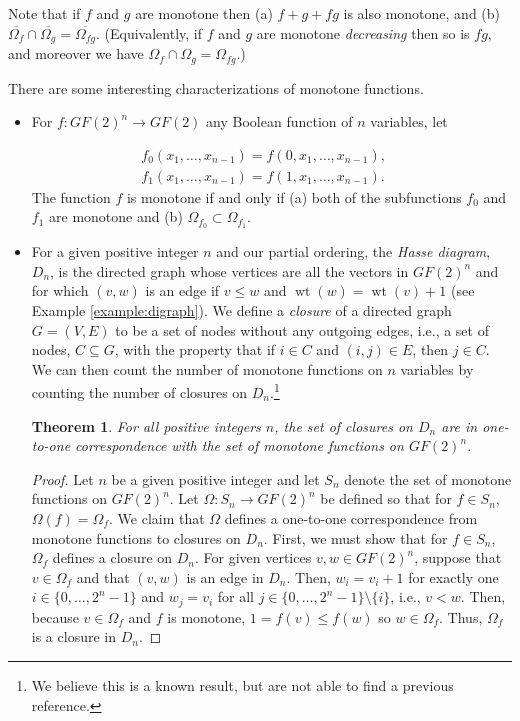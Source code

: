 \documentclass[12pt]{article}
\newtheorem{theorem}{Theorem}
\newcommand{\wt}{\mathop{wt}}
\begin{document}
Note that if $f$ and $g$ are monotone then (a) $f+g+fg$ is also
monotone, and (b) $\overline{\Omega_f}\cap  \overline{\Omega_g}
=\overline{\Omega_{fg}}$.
(Equivalently, if $f$ and $g$ are monotone {\it decreasing} then
so is $fg$, and moreover we have $\Omega_f\cap \Omega_g
=\Omega_{fg}$.)

There are some interesting characterizations of monotone functions.

\begin{itemize}
\item
For $f:GF(2)^n \to GF(2)$ any Boolean function of $n$ variables,
let

\[
\begin{array}{c}
f_0(x_1,\dots ,x_{n-1}) = f(0,x_1,\dots ,x_{n-1}),
\ \ \ \ \ \\
f_1(x_1,\dots ,x_{n-1}) = f(1,x_1,\dots ,x_{n-1}).
\end{array}
\]
The function $f$ is monotone if and only if
(a) both of the subfunctions $f_0$ and $f_1$ are
monotone and (b) $\Omega_{f_0} \subset \Omega_{f_1}$.

\item For a given positive integer $n$ and our partial ordering, the
  {\it Hasse diagram}, $D_n$, is the directed graph whose vertices are
  all the vectors in $GF(2)^n$ and for which $(v,w)$ is an edge if
  $v\leq w$ and $\wt(w)=\wt(v)+1$ (see Example
  \ref{example:digraph}).  We define a {\it closure} of a directed
  graph $G = (V,E)$ to be a set of nodes without any outgoing edges,
  i.e., a set of nodes, $C \subseteq G$, with the property that if $i
  \in C$ and $(i,j) \in E$, then $j \in C$. We can then count the
  number of monotone functions on $n$ variables by counting the number
  of closures on $D_n$.\footnote{We believe this is a known result,
    but are not able to find a previous reference.}
  \begin{theorem}
    For all positive integers $n$, the set of closures on $D_n$ are in
    one-to-one correspondence with the set of monotone functions on
    $GF(2)^n$.
  \end{theorem}
  \begin{proof}
    Let $n$ be a given positive integer and let $S_n$ denote the set
    of monotone functions on $GF(2)^n$. Let $\Omega:S_n \rightarrow
    GF(2)^n$ be defined so that for $f \in S_n$, $\Omega(f) =
    \Omega_f$. We claim that $\Omega$
    defines a one-to-one correspondence from monotone functions to
    closures on $D_n$. First, we must show that for $f\in S_n$, $\Omega_f$ defines a
    closure on $D_n$. For given vertices $v,w \in GF(2)^n$, suppose
    that $v \in \Omega_f$ and that $(v,w)$ is an edge in $D_n$. Then,
    $w_i = v_i + 1$ for exactly one $i \in \{0,\ldots,2^n-1\}$ and
    $w_j = v_i$ for all $j \in \{0,\ldots,2^n-1\} \setminus \{i\}$,
    i.e., $v < w$. Then, because $v \in \Omega_f$ and $f$ is monotone,
    $1 = f(v) \leq f(w)$ so $w \in \Omega_f$. Thus, $\Omega_f$ is a
    closure in $D_n$.


\end{proof}
\end{itemize}
\end{document}
